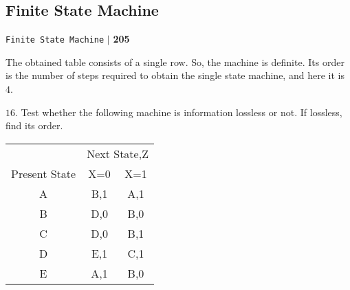 \documentclass[a4,9pt]{beamer}
\begin{document}
\begin{frame}
\section*{Finite State Machine}
\begin{flushright}
\texttt{Finite State Machine} \hspace*{0.1cm}\textbf{$|$} \hspace*{0.1cm} \textbf{205}\hspace*{0.1cm}
\end{flushright}
\vspace*{0.5cm}

\pause

\hspace*{0.5cm} The obtained table consists of a single row. So, the machine is definite. Its order is the number of steps required to obtain the single state machine, and here it is $4$.


\pause
$16.$ Test whether the following machine is information lossless or not. If lossless, find its order.

\pause
\begin{center}
\begin{tabular}{ccc}
 \hline

 \hline

 \hline

 \hline
 & \multicolumn{2}{c}{Next State,Z}\\
 \cline{2-3}
Present State & X=0           &   X=1\\
\hline
    A    &  B,1  & A,1 \\
    B    &  D,0  & B,0 \\
    C    &  D,0  & B,1 \\
    D    &  E,1  & C,1 \\
    E    &  A,1  & B,0 \\
 \hline

 \hline

 \hline

 \hline
\end{tabular}
\end{center}
\end{frame}
\end{document}
